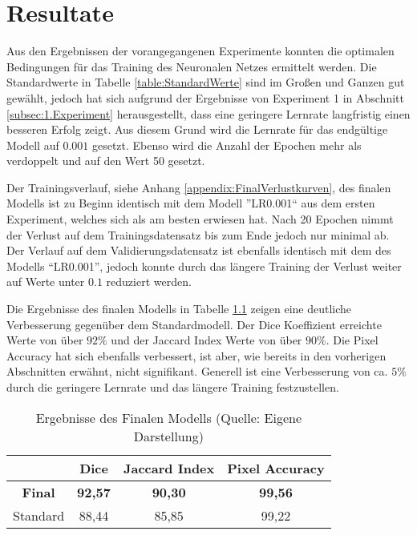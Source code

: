 \chapter{Resultate}
Aus den Ergebnissen der vorangegangenen Experimente konnten die optimalen Bedingungen für das Training des Neuronalen Netzes ermittelt werden. Die Standardwerte in Tabelle \ref{table:StandardWerte} sind im Großen und Ganzen gut gewählt, jedoch hat sich aufgrund der Ergebnisse von Experiment 1 in Abschnitt \ref{subsec:1.Experiment} herausgestellt, dass eine geringere Lernrate langfristig einen besseren Erfolg zeigt. Aus diesem Grund wird die Lernrate für das endgültige Modell auf $0.001$ gesetzt. Ebenso wird die Anzahl der Epochen mehr als verdoppelt und auf den Wert 50 gesetzt.

Der Trainingsverlauf, siehe Anhang \ref{appendix:FinalVerlustkurven}, des finalen Modells ist zu Beginn identisch mit dem Modell ''LR0.001`` aus dem ersten Experiment, welches sich als am besten erwiesen hat. Nach 20 Epochen nimmt der Verlust auf dem Trainingsdatensatz bis zum Ende jedoch nur minimal ab. Der Verlauf auf dem Validierungsdatensatz ist ebenfalls identisch mit dem des Modells ``LR0.001'', jedoch konnte durch das längere Training der Verlust weiter auf Werte unter $0.1$ reduziert werden. 

Die Ergebnisse des finalen Modells in Tabelle \ref{table:FinalErgebnisse} zeigen eine deutliche Verbesserung gegenüber dem Standardmodell. Der Dice Koeffizient erreichte Werte von über $92\%$ und der Jaccard Index Werte von über $90\%$. Die Pixel Accuracy hat sich ebenfalls verbessert, ist aber, wie bereits in den vorherigen Abschnitten erwähnt, nicht signifikant. Generell ist eine Verbesserung von ca. $5\%$ durch die geringere Lernrate und das längere Training festzustellen.
\begin{table}[!h]
	\centering
	\begin{tabular}{|c|c|c|c|}
		\hline
		& Dice 				& Jaccard Index 	& Pixel Accuracy \\
		\hline
		\textbf{Final}		& \textbf{92,57} 	& \textbf{90,30}  	& \textbf{99,56}  \\
		\hline
		Standard		& 88,44 			& 85,85  			& 99,22  \\
		\hline
	\end{tabular}
	\caption{Ergebnisse des Finalen Modells (Quelle: Eigene Darstellung)}
	\label{table:FinalErgebnisse}
\end{table}

